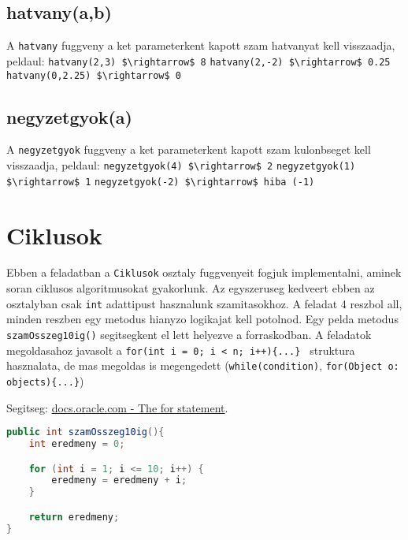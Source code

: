 \documentclass{article}
\begin{document}
\newpage
\subsection{hatvany(a,b)}
A \lstinline{hatvany} fuggveny a ket parameterkent kapott szam hatvanyat kell visszaadja, peldaul:\newline
\lstinline[mathescape]{hatvany(2,3) $\rightarrow$ 8}\newline
\lstinline[mathescape]{hatvany(2,-2) $\rightarrow$ 0.25}\newline
\lstinline[mathescape]{hatvany(0,2.25) $\rightarrow$ 0}\newline

\subsection{negyzetgyok(a)}
A \lstinline{negyzetgyok} fuggveny a ket parameterkent kapott szam kulonbseget kell visszaadja,
peldaul:\newline
\lstinline[mathescape]{negyzetgyok(4) $\rightarrow$ 2}\newline
\lstinline[mathescape]{negyzetgyok(1) $\rightarrow$ 1}\newline
\lstinline[mathescape]{negyzetgyok(-2) $\rightarrow$ hiba (-1)}\newline

\newpage
\section{Ciklusok}

Ebben a feladatban a \lstinline{Ciklusok} osztaly fuggvenyeit fogjuk implementalni, aminek soran ciklusos algoritmusokat gyakorlunk. Az egyszeruseg kedveert ebben az osztalyban csak \lstinline{int} adattipust hasznalunk szamitasokhoz. A feladat 4 reszbol all, minden reszben egy metodus hianyzo logikajat kell potolnod. Egy pelda metodus \lstinline{szamOsszeg10ig()} segitsegkent el lett helyezve a forraskodban. A feladatok megoldasahoz javasolt a \lstinline|for(int i = 0; i < n; i++){...} | struktura hasznalata, de mas megoldas is megengedett (\lstinline{while(condition)}, \lstinline|for(Object o: objects){...}|)\

Segitseg: \href{https://docs.oracle.com/javase/tutorial/java/nutsandbolts/for.html}{docs.oracle.com - The for statement}.

\begin{lstlisting}[language=Java, caption=Pelda Metodus]
public int szamOsszeg10ig(){
    int eredmeny = 0;

    for (int i = 1; i <= 10; i++) {
        eredmeny = eredmeny + i;
    }

    return eredmeny;
}
\end{lstlisting}
\end{document}
